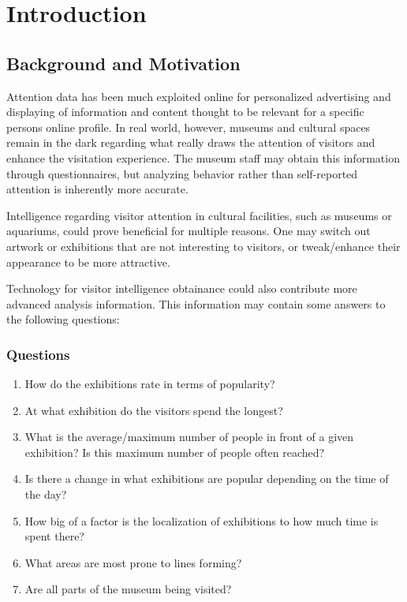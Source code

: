 \section{Introduction}


\subsection{Background and Motivation}
Attention data has been much exploited online for personalized advertising and displaying of information and content thought to be relevant for a specific persons online profile. In real world, however, museums and cultural spaces remain in the dark regarding what really draws the attention of visitors and enhance the visitation experience. The museum staff may obtain this information through questionnaires, but analyzing behavior rather than self-reported attention is inherently more accurate. 

Intelligence regarding visitor attention in cultural facilities, such as museums or aquariums, could prove beneficial for multiple reasons. One may switch out artwork or exhibitions that are not interesting to visitors, or tweak/enhance their appearance to be more attractive. 

Technology for visitor intelligence obtainance could also contribute more advanced analysis information. This information may contain some answers to the following questions:
\subsubsection*{Questions}
\begin{enumerate}
    \item How do the exhibitions rate in terms of popularity?
    \item At what exhibition do the visitors spend the longest?
    \item What is the average/maximum number of people in front of a given exhibition? Is this maximum number of people often reached?
    \item Is there a change in what exhibitions are popular depending on the time of the day?
    \item How big of a factor is the localization of exhibitions to how much time is spent there? 
    \item What areas are most prone to lines forming?
    \item Are all parts of the museum being visited?
\end{enumerate}

